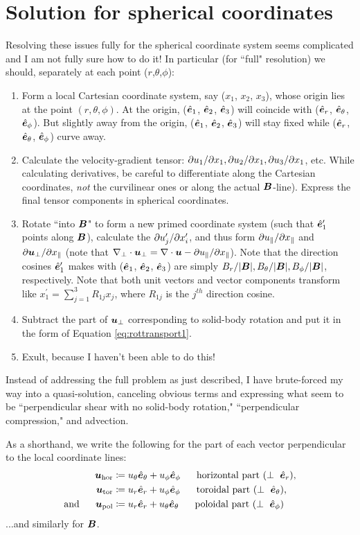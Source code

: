 \documentclass[12pt]{article}
\newcommand{\xpar}{x_\parallel}
\newcommand{\upar}{u_\parallel}
\newcommand{\uperp}{\vecu_\perp}
\newcommand{\uhor}{\vecu_{\rm{hor}}}
\newcommand{\utor}{\vecu_{\rm{tor}}}
\begin{document}
\section{Solution for spherical coordinates}
Resolving these issues fully for the spherical coordinate system seems complicated and I am not fully sure how to do it! In particular (for ``full" resolution) we should, separately at each point ($r$,$\theta$,$\phi$):
\begin{enumerate}
	\item Form a local Cartesian coordinate system, say ($x_1$, $x_2$, $x_3$), whose origin lies at the point $(r,\theta,\phi)$. At the origin, ($\hat{\bm{e}}_1$, $\hat{\bm{e}}_2$, $\hat{\bm{e}}_3$) will coincide with ($\hat{\bm{e}}_r$, $\hat{\bm{e}}_\theta$, $\hat{\bm{e}}_\phi$). But slightly away from the origin, ($\hat{\bm{e}}_1$, $\hat{\bm{e}}_2$, $\hat{\bm{e}}_3$) will stay fixed while ($\hat{\bm{e}}_r$, $\hat{\bm{e}}_\theta$, $\hat{\bm{e}}_\phi$) curve away. 
	\item Calculate the velocity-gradient tensor: $\partial u_1/\partial x_1,\partial u_2/\partial x_1, \partial u_3/\partial x_1$, etc. While calculating derivatives, be careful to differentiate along the Cartesian coordinates, \textit{not} the curvilinear ones or along the actual $\bm{B}$-line). Express the final tensor components in spherical coordinates.
	\item Rotate ``into $\bm{B}$" to form a new primed coordinate system (such that $\hat{\bm{e}}_1^\prime$ points along $\bm{B}$), calculate the $\partial u_j^\prime/\partial x_i^\prime$, and thus form $\pderivline{\upar}{\xpar}$ and $\pderivline{\uperp}{\xpar}$ (note that $\nabla_\perp\cdot\uperp=\Div\vecu- \pderivline{\upar}{\xpar}$). Note that the direction cosines $\hat{\bm{e}}_1^\prime$ makes with ($\hat{\bm{e}}_1$, $\hat{\bm{e}}_2$, $\hat{\bm{e}}_3$) are simply $B_r/|\bm{B}|, B_\theta/|\bm{B}|, B_\phi/|\bm{B}|$, respectively. Note that both unit vectors and vector components transform like $x_1^\prime=\sum_{j=1}^3R_{1j}x_j$, where $R_{1j}$ is the $j^{th}$ direction cosine.  
	\item Subtract the part of $\uperp$ corresponding to solid-body rotation and put it in the form of Equation \eqref{eq:rottransport1}. 
	\item Exult, because I haven't been able to do this!
\end{enumerate}
Instead of addressing the full problem as just described, I have brute-forced my way into a quasi-solution, canceling obvious terms and expressing what seem to be ``perpendicular shear with no solid-body rotation," ``perpendicular compression," and advection. 

As a shorthand, we write the following for the part of each vector perpendicular to the local coordinate lines:
\begin{subequations}
\begin{align}
	\uhor &\define  \ut\et + \up\ep\five\text{horizontal part ($\perp\ \er$)},\\
	\utor &\define  \ur\er + \up\ep\five\text{toroidal part ($\perp\ \et$)},\\
	\andd \upol &\define  \ur\er + \ut\et   \five\text{poloidal part ($\perp\ \ep$)}
\end{align}
\end{subequations}
...and similarly for $\bm{B}$. 
\end{document}
